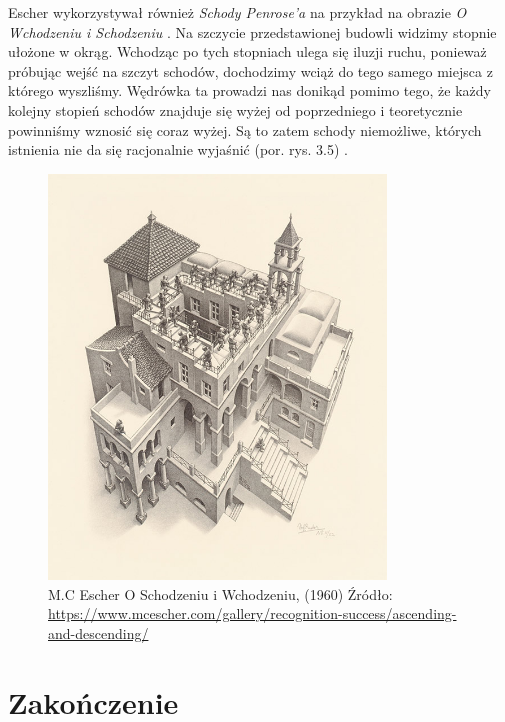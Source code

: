 \documentclass[licencjacka]{kdypl}
\begin{document}
 Escher wykorzystywał również \textit{Schody Penrose'a} na przykład na obrazie \textit{O Wchodzeniu i Schodzeniu} \citep[s. 147]{Locher}. Na szczycie przedstawionej budowli widzimy stopnie ułożone w okrąg. Wchodząc po tych stopniach ulega się iluzji ruchu, ponieważ próbując wejść na szczyt schodów, dochodzimy wciąż do tego samego miejsca z którego wyszliśmy. Wędrówka ta prowadzi nas donikąd pomimo tego, że każdy kolejny stopień schodów znajduje się wyżej od poprzedniego i teoretycznie powinniśmy wznosić się coraz wyżej. Są to zatem schody niemożliwe, których istnienia nie da się racjonalnie wyjaśnić  (por. rys. 3.5) \citep[s. 31-33]{Penrose1958}.

\begin{figure}[H]
\includegraphics[width=0.8\textwidth]{ascending.jpg}
\centering
\caption{M.C Escher O Schodzeniu i Wchodzeniu, (1960) Źródło: \url{https://www.mcescher.com/gallery/recognition-success/ascending-and-descending/}}
\end{figure}


















\chapter*{Zakończenie}
\end{document}
